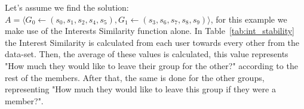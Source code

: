 \begin{table}[H]
\centering
{}
\caption{Example dataset of 10 students}
\label{tab:example_dataset}
\end{table}

Let's assume we find the solution: $ A = \langle G_0 \leftarrow (s_0,s_1,s_2,s_4,s_5), G_1 \leftarrow (s_3,s_6,s_7,s_8,s_9) \rangle$, for this example we make use of the Interests Similarity function alone. In Table~\ref{tab:int_stability} the Interest Similarity is calculated from each user towards every other from the data-set. Then, the average of these values is calculated, this value represents "How much they would like to leave their group for the other?" according to the rest of the members. After that, the same is done for the other groups, representing "How much they would like to leave this group if they were a member?".\\

